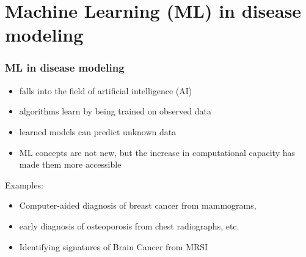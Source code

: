 \documentclass[notes, c, 11pt, xcolor=svgnames, hyperref={colorlinks,citecolor=DeepPink4,linkcolor=DarkRed,urlcolor=DarkBlue}]{beamer}
\begin{document}
\section{Machine Learning (ML) in disease modeling}


\begin{frame}
	\frametitle{ML in disease modeling}
	
	\begin{itemize}
		\item falls into the field of \alert{artificial intelligence (AI)}
		\item algorithms \alert{learn} by being trained on observed data
		\item learned models can \alert{predict unknown data}
		\item ML concepts are not new, but the increase in computational capacity has made them more accessible
	\end{itemize}

\vspace{0.2cm}

\alert{Examples:} 
\begin{itemize}
	\item Computer-aided diagnosis of breast cancer from mammograms,
	\item early diagnosis of osteoporosis from chest radiographs, etc. 
	\item Identifying signatures of Brain Cancer from MRSI 
\end{itemize}
	
	
\end{frame}
\end{document}
